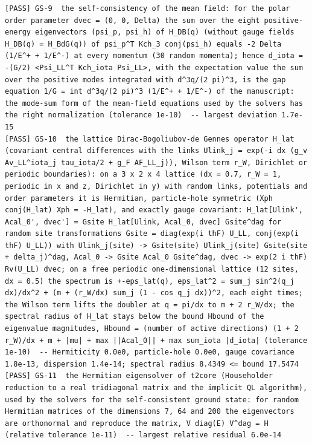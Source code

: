 \documentclass[
  10pt,
]{article}
\begin{document}
\begin{verbatim}
[PASS] GS-9  the self-consistency of the mean field: for the polar order parameter dvec = (0, 0, Delta) the sum over the eight positive-energy eigenvectors (psi_p, psi_h) of H_DB(q) (without gauge fields H_DB(q) = H_BdG(q)) of psi_p^T Kch_3 conj(psi_h) equals -2 Delta (1/E^+ + 1/E^-) at every momentum (30 random momenta); hence d_iota = -(G/2) <Psi_LL^T Kch_iota Psi_LL>, with the expectation value the sum over the positive modes integrated with d^3q/(2 pi)^3, is the gap equation 1/G = int d^3q/(2 pi)^3 (1/E^+ + 1/E^-) of the manuscript: the mode-sum form of the mean-field equations used by the solvers has the right normalization (tolerance 1e-10)  -- largest deviation 1.7e-15
[PASS] GS-10  the lattice Dirac-Bogoliubov-de Gennes operator H_lat (covariant central differences with the links Ulink_j = exp(-i dx (g_v Av_LL^iota_j tau_iota/2 + g_F AF_LL_j)), Wilson term r_W, Dirichlet or periodic boundaries): on a 3 x 2 x 4 lattice (dx = 0.7, r_W = 1, periodic in x and z, Dirichlet in y) with random links, potentials and order parameters it is Hermitian, particle-hole symmetric (Xph conj(H_lat) Xph = -H_lat), and exactly gauge covariant: H_lat[Ulink', Acal_0', dvec'] = Gsite H_lat[Ulink, Acal_0, dvec] Gsite^dag for random site transformations Gsite = diag(exp(i thF) U_LL, conj(exp(i thF) U_LL)) with Ulink_j(site) -> Gsite(site) Ulink_j(site) Gsite(site + delta_j)^dag, Acal_0 -> Gsite Acal_0 Gsite^dag, dvec -> exp(2 i thF) Rv(U_LL) dvec; on a free periodic one-dimensional lattice (12 sites, dx = 0.5) the spectrum is +-eps_lat(q), eps_lat^2 = sum_j sin^2(q_j dx)/dx^2 + (m + (r_W/dx) sum_j (1 - cos q_j dx))^2, each eight times; the Wilson term lifts the doubler at q = pi/dx to m + 2 r_W/dx; the spectral radius of H_lat stays below the bound Hbound of the eigenvalue magnitudes, Hbound = (number of active directions) (1 + 2 r_W)/dx + m + |mu| + max ||Acal_0|| + max sum_iota |d_iota| (tolerance 1e-10)  -- Hermiticity 0.0e0, particle-hole 0.0e0, gauge covariance 1.8e-13, dispersion 1.4e-14; spectral radius 8.4349 <= bound 17.5474
[PASS] GS-11  the Hermitian eigensolver of t2core (Householder reduction to a real tridiagonal matrix and the implicit QL algorithm), used by the solvers for the self-consistent ground state: for random Hermitian matrices of the dimensions 7, 64 and 200 the eigenvectors are orthonormal and reproduce the matrix, V diag(E) V^dag = H (relative tolerance 1e-11)  -- largest relative residual 6.0e-14

\end{verbatim}
\end{document}
